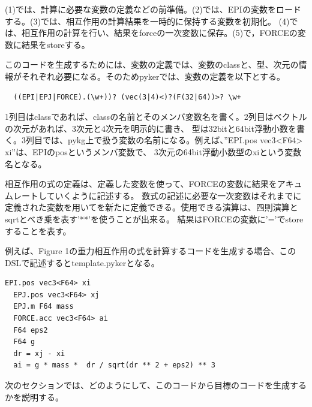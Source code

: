 \documentclass{jarticle}
\begin{document}
  (1)では、計算に必要な変数の定義などの前準備。(2)では、EPIの変数をロードする。(3)では、相互作用の計算結果を一時的に保持する変数を初期化。
  (4)では、相互作用の計算を行い、結果をforceの一次変数に保存。(5)で，FORCEの変数に結果をstoreする。

  このコードを生成するためには、変数の定義では、変数のclassと、型、次元の情報がそれぞれ必要になる。そのためpykerでは、変数の定義を以下とする。
  \begin{lstlisting}
  ((EPI|EPJ|FORCE).(\w+))? (vec(3|4)<)?(F(32|64))>? \w+
  \end{lstlisting}
  
  1列目はclassであれば、classの名前とそのメンバ変数名を書く。2列目はベクトルの次元があれば、3次元と4次元を明示的に書き、
  型は32bitと64bit浮動小数を書く。3列目では、pykg上で扱う変数の名前になる。例えば、”EPI.pos vec3<F64> xi”は、EPIのposというメンバ変数で、
  3次元の64bit浮動小数型のxiという変数名となる。
  
  相互作用の式の定義は、定義した変数を使って、FORCEの変数に結果をアキュムレートしていくように記述する。
  数式の記述に必要な一次変数はそれまでに定義された変数を用いてを新たに定義できる。使用できる演算は、四則演算とsqrtとべき乗を表す'**'を使うことが出来る。
  結果はFORCEの変数に'='でstoreすることを表す。
  
  例えば、Figure 1の重力相互作用の式を計算するコードを生成する場合、このDSLで記述するとtemplate.pykerとなる。

\begin{lstlisting}[frame=single, caption=hoge, label=fuga]
  EPI.pos vec3<F64> xi
  EPJ.pos vec3<F64> xj
  EPJ.m F64 mass
  FORCE.acc vec3<F64> ai
  F64 eps2
  F64 g
  dr = xj - xi
  ai = g * mass *  dr / sqrt(dr ** 2 + eps2) ** 3
\end{lstlisting}

次のセクションでは、どのようにして、このコードから目標のコードを生成するかを説明する。
\end{document}
